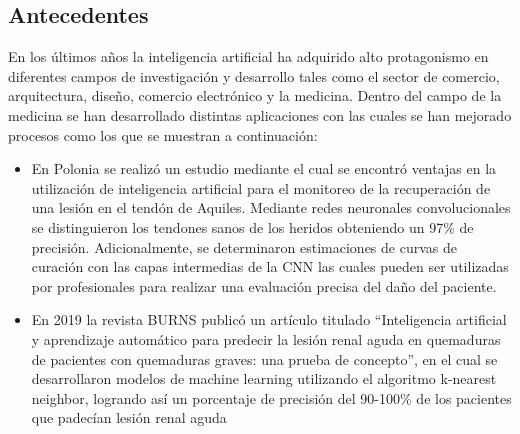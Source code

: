\subsection{Antecedentes}

En los últimos años la inteligencia artificial ha adquirido alto protagonismo en diferentes campos de investigación y desarrollo tales como el sector de comercio, arquitectura, diseño, comercio electrónico y la medicina. Dentro del campo de la medicina se han desarrollado distintas aplicaciones con las cuales se han mejorado procesos como los que se muestran a continuación:\\

\begin{itemize}
\item En Polonia se realizó un estudio mediante el cual se encontró ventajas en la utilización de inteligencia artificial para el monitoreo de la recuperación de una lesión en el tendón de Aquiles. Mediante redes neuronales convolucionales se distinguieron los tendones sanos de los heridos obteniendo un 97\% de precisión. Adicionalmente, se determinaron estimaciones de curvas de curación con las capas intermedias de la CNN las cuales pueden ser utilizadas por profesionales para realizar una evaluación precisa del daño del paciente.\\
\item En  2019 la revista BURNS publicó un artículo titulado “Inteligencia artificial y aprendizaje automático para predecir la lesión renal aguda en quemaduras de pacientes con quemaduras graves: una prueba de concepto”, en el cual se desarrollaron modelos de machine learning utilizando el algoritmo k-nearest neighbor, logrando así un porcentaje de precisión del 90-100\% de los pacientes que padecían lesión renal aguda
\end{itemize}

